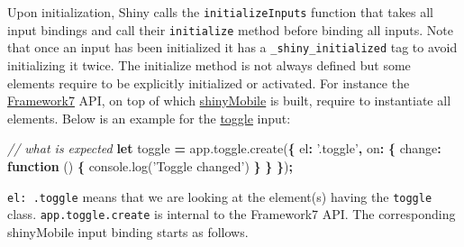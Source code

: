\documentclass[
]{book}
\newenvironment{Shaded}{\begin{snugshade}}{\end{snugshade}}
\newcommand{\AttributeTok}[1]{\textcolor[rgb]{0.77,0.63,0.00}{#1}}
\newcommand{\CommentTok}[1]{\textcolor[rgb]{0.56,0.35,0.01}{\textit{#1}}}
\newcommand{\DataTypeTok}[1]{\textcolor[rgb]{0.13,0.29,0.53}{#1}}
\newcommand{\KeywordTok}[1]{\textcolor[rgb]{0.13,0.29,0.53}{\textbf{#1}}}
\newcommand{\NormalTok}[1]{#1}
\newcommand{\OperatorTok}[1]{\textcolor[rgb]{0.81,0.36,0.00}{\textbf{#1}}}
\newcommand{\StringTok}[1]{\textcolor[rgb]{0.31,0.60,0.02}{#1}}
\newcommand{\VariableTok}[1]{\textcolor[rgb]{0.00,0.00,0.00}{#1}}
\begin{document}
Upon initialization, Shiny calls the \texttt{initializeInputs} function that takes all input bindings and call their \texttt{initialize} method before binding all inputs. Note that once an input has been initialized it has a \texttt{\_shiny\_initialized} tag to avoid initializing it twice. The initialize method is not always defined but some elements require to be explicitly initialized or activated. For instance the \href{https://framework7.io}{Framework7} API, on top of which \href{https://github.com/RinteRface/shinyMobile}{shinyMobile} is built, require to instantiate all elements. Below is an example for the \href{https://framework7.io/docs/toggle.html}{toggle} input:

\begin{Shaded}
\begin{Highlighting}[]
\CommentTok{// what is expected}
\KeywordTok{let}\NormalTok{ toggle }\OperatorTok{=} \VariableTok{app}\NormalTok{.}\VariableTok{toggle}\NormalTok{.}\AttributeTok{create}\NormalTok{(}\OperatorTok{\{}
  \DataTypeTok{el}\OperatorTok{:} \StringTok{'.toggle'}\OperatorTok{,}
  \DataTypeTok{on}\OperatorTok{:} \OperatorTok{\{}
    \DataTypeTok{change}\OperatorTok{:} \KeywordTok{function}\NormalTok{ () }\OperatorTok{\{}
      \VariableTok{console}\NormalTok{.}\AttributeTok{log}\NormalTok{(}\StringTok{'Toggle changed'}\NormalTok{)}
    \OperatorTok{\}}
  \OperatorTok{\}}
\OperatorTok{\}}\NormalTok{)}\OperatorTok{;}
\end{Highlighting}
\end{Shaded}

\texttt{el:\ \textquotesingle{}.toggle\textquotesingle{}} means that we are looking at the element(s) having the \texttt{toggle} class. \texttt{app.toggle.create} is internal to the Framework7 API. The corresponding shinyMobile input binding starts as follows.

\begin{Shaded}
\end{Shaded}
\end{document}
